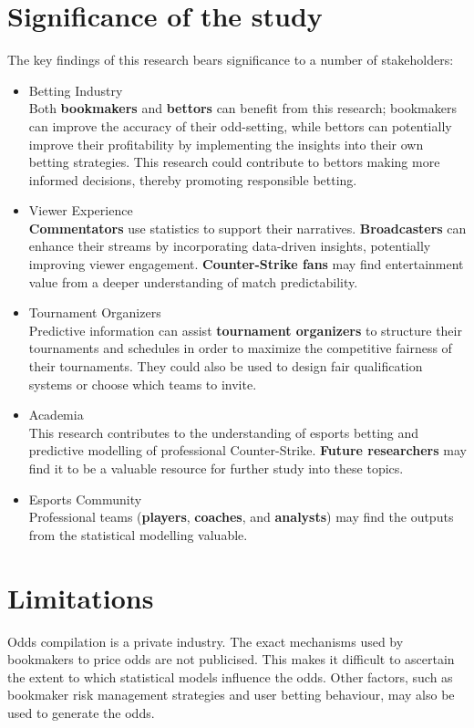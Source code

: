 \section{Significance of the study}

The key findings of this research bears significance to a number of stakeholders:
\begin{itemize}
	\item Betting Industry\\
	Both \textbf{bookmakers} and \textbf{bettors} can benefit from this research; bookmakers can improve the accuracy of their odd-setting, while bettors can potentially improve their profitability by implementing the insights into their own betting strategies. This research could contribute to bettors making more informed decisions, thereby promoting responsible betting.
	\item Viewer Experience\\\textbf{Commentators} use statistics to support their narratives. \textbf{Broadcasters} can enhance their streams by incorporating data-driven insights, potentially improving viewer engagement. \textbf{Counter-Strike fans} may find entertainment value from a deeper understanding of match predictability.
	\item Tournament Organizers\\
	Predictive information can assist \textbf{tournament organizers} to structure their tournaments and schedules in order to maximize the competitive fairness of their tournaments. They could also be used to design fair qualification systems or choose which teams to invite.
	\item Academia\\
	This research contributes to the understanding of esports betting and predictive modelling of professional Counter-Strike. \textbf{Future researchers} may find it to be a valuable resource for further study into these topics.
	\item Esports Community\\
	Professional teams (\textbf{players}, \textbf{coaches}, and \textbf{analysts}) may find the outputs from the statistical modelling valuable.
	
\end{itemize}

\section{Limitations}

Odds compilation is a private industry. The exact mechanisms used by bookmakers to price odds are not publicised. This makes it difficult to ascertain the extent to which statistical models influence the odds. Other factors, such as bookmaker risk management strategies and user betting behaviour, may also be used to generate the odds.

